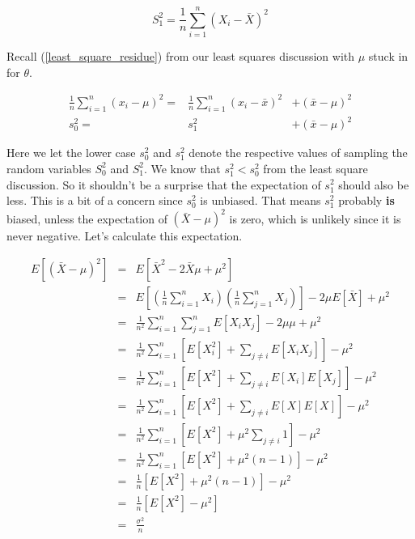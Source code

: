 \documentclass[]{article}
\begin{document}
\begin{equation} \label{s1}
S_1^2 = \frac{1}{n} \sum_{i=1}^n (X_i - \bar{X})^2
\end{equation}

Recall (\ref{least_square_residue}) from our least squares
discussion with $\mu$ stuck in for $\theta$.

\begin{eqnarray}
\frac{1}{n} \sum_{i=1}^n (x_i - \mu)^2
  = & \frac{1}{n} \sum_{i=1}^n (x_i - \bar{x})^2 & +
  (\bar{x} - \mu)^2  \nonumber \\
s_0^2 = & s_1^2 & + (\bar{x} - \mu)^2 \label{var_diff}
\end{eqnarray}

Here we let the lower case $s_0^2$ and $s_1^2$ denote the respective
values of sampling the random variables $S_0^2$ and $S_1^2$.
We know that $s_1^2 < s_0^2$ from the least square discussion.
So it shouldn't be a surprise that the expectation of $s_1^2$
should also be less.  This is a bit of a concern since 
$s_0^2$ is unbiased.  That means $s_1^2$ probably \textbf{is} biased,
unless the expectation of $(\bar{X} - \mu)^2$ is zero, which
is unlikely since it is never negative.  Let's calculate
this expectation.

\begin{eqnarray}
E \left[ (\bar{X} - \mu)^2 \right] &= &E \left[ \bar{X}^2 - 2 \bar{X} \mu + \mu^2 \right] \nonumber \\
   &= & E \left[ \left( \frac{1}{n} \sum_{i=1}^n X_i \right) 
       \left( \frac{1}{n} \sum_{j=1}^n X_j \right) \right]
       - 2 \mu E[\bar{X}] + \mu^2  \nonumber \\
   &= & \frac{1}{n^2} \sum_{i=1}^n \sum_{j=1}^n  E \left[ X_i X_j \right]
       - 2 \mu \mu + \mu^2  \nonumber \\
   &= & \frac{1}{n^2} \sum_{i=1}^n \left[ E[X_i^2] + \sum_{j \ne i}  E \left[ X_i X_j \right] \right]
       - \mu^2 \label{voa1}  \\
   &= & \frac{1}{n^2} \sum_{i=1}^n \left[ E[X^2] + \sum_{j \ne i}  E \left[X_i \right] E \left[X_j \right] \right]
       - \mu^2 \label{voa2}  \\
   &= & \frac{1}{n^2} \sum_{i=1}^n \left[ E[X^2] + \sum_{j \ne i}  E \left[X \right] E \left[X \right] \right]
       - \mu^2  \label{voa3}  \\
   &= & \frac{1}{n^2} \sum_{i=1}^n \left[ E[X^2] + \mu^2 \sum_{j \ne i} 1 \right] - \mu^2 \nonumber \\
   &= & \frac{1}{n^2} \sum_{i=1}^n \left[ E[X^2] + \mu^2 (n-1) \right] - \mu^2 \nonumber \\
   &= & \frac{1}{n} \left[ E[X^2] + \mu^2 (n-1) \right] - \mu^2 \nonumber \\
   &= & \frac{1}{n} \left[ E[X^2] - \mu^2 \right]  \nonumber \\
   &= & \frac{\sigma^2}{n}
\end{eqnarray}
\end{document}

